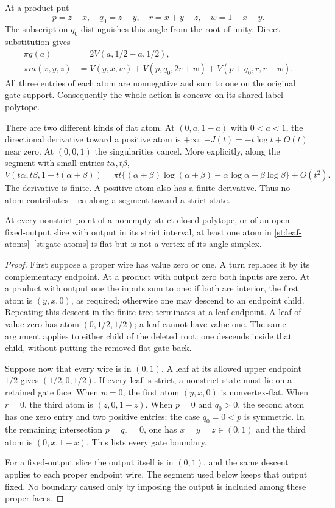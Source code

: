 At a product put
\[
 p=z-x,\quad q_0=z-y,\quad r=x+y-z,\quad w=1-x-y.
\]
The subscript on $q_0$ distinguishes this angle from
the root of unity. Direct substitution gives
\begin{align}
 \pi g(a)&=2V(a,1/2-a,1/2),\label{st:leaf-atoms}\\
 \pi m(x,y,z)&=
 V(y,x,w)+V(p,q_0,2r+w)+V(p+q_0,r,r+w).
 \label{st:gate-atoms}
\end{align}
All three entries of each atom are nonnegative and sum
to one on the original gate support. Consequently the
whole action is concave on its shared-label polytope.

There are two different kinds of flat atom. At
$(0,a,1-a)$ with $0<a<1$, the directional derivative
toward a positive atom is $+\infty$:
$-J(t)=-t\log t+O(t)$ near zero.
At $(0,0,1)$ the singularities cancel. More explicitly,
along the segment with small entries $t\alpha,t\beta$,
\[
 V(t\alpha,t\beta,1-t(\alpha+\beta))
 =\pi t\{(\alpha+\beta)\log(\alpha+\beta)
                  -\alpha\log\alpha-\beta\log\beta\}
       +O(t^2).
\]
The derivative is finite. A positive atom also has a
finite derivative. Thus no atom contributes $-\infty$
along a segment toward a strict state.

\begin{lemma}\label{st:barrier}
At every nonstrict point of a nonempty strict closed
polytope, or of an open fixed-output slice with output
in its strict interval, at least one atom in
\eqref{st:leaf-atoms}--\eqref{st:gate-atoms} is flat
but is not a vertex of its angle simplex.
\end{lemma}
\begin{proof}
First suppose a proper wire has value zero or one.
A turn replaces it by its complementary endpoint.
At a product with output zero both inputs are zero.
At a product with output one the inputs sum to one:
if both are interior, the first atom is $(y,x,0)$,
as required; otherwise one may descend to an endpoint
child. Repeating this descent in the finite tree
terminates at a leaf endpoint. A leaf of value zero
has atom $(0,1/2,1/2)$; a leaf cannot have value one.
The same argument applies to either child of the
deleted root: one descends inside that child, without
putting the removed flat gate back.

Suppose now that every wire is in $(0,1)$.
A leaf at its allowed upper endpoint $1/2$ gives
$(1/2,0,1/2)$. If every leaf is strict, a nonstrict
state must lie on a retained gate face.
When $w=0$, the first atom $(y,x,0)$ is nonvertex-flat.
When $r=0$, the third atom is $(z,0,1-z)$.
When $p=0$ and $q_0>0$, the second atom has one zero
entry and two positive entries; the case $q_0=0<p$
is symmetric. In the remaining intersection
$p=q_0=0$, one has $x=y=z\in(0,1)$ and the third
atom is $(0,x,1-x)$. This lists every gate boundary.

For a fixed-output slice the output itself is in
$(0,1)$, and the same descent applies to each proper
endpoint wire. The segment used below keeps that
output fixed. No boundary caused only by imposing
the output is included among these proper faces.
\end{proof}

